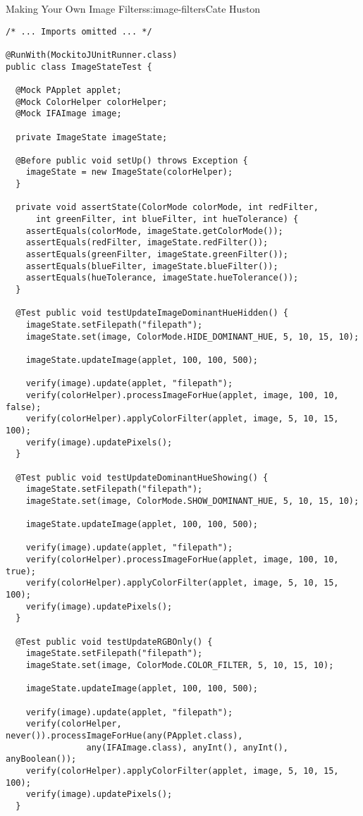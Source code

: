 \begin{aosachapter}{Making Your Own Image Filters}{s:image-filters}{Cate Huston}
\begin{verbatim}
/* ... Imports omitted ... */

@RunWith(MockitoJUnitRunner.class)
public class ImageStateTest {

  @Mock PApplet applet;
  @Mock ColorHelper colorHelper;
  @Mock IFAImage image;

  private ImageState imageState;

  @Before public void setUp() throws Exception {
    imageState = new ImageState(colorHelper);
  }

  private void assertState(ColorMode colorMode, int redFilter,
      int greenFilter, int blueFilter, int hueTolerance) {
    assertEquals(colorMode, imageState.getColorMode());
    assertEquals(redFilter, imageState.redFilter());
    assertEquals(greenFilter, imageState.greenFilter());
    assertEquals(blueFilter, imageState.blueFilter());
    assertEquals(hueTolerance, imageState.hueTolerance());
  }

  @Test public void testUpdateImageDominantHueHidden() {
    imageState.setFilepath("filepath");
    imageState.set(image, ColorMode.HIDE_DOMINANT_HUE, 5, 10, 15, 10);

    imageState.updateImage(applet, 100, 100, 500);

    verify(image).update(applet, "filepath");
    verify(colorHelper).processImageForHue(applet, image, 100, 10, false);
    verify(colorHelper).applyColorFilter(applet, image, 5, 10, 15, 100);
    verify(image).updatePixels();
  }

  @Test public void testUpdateDominantHueShowing() {
    imageState.setFilepath("filepath");
    imageState.set(image, ColorMode.SHOW_DOMINANT_HUE, 5, 10, 15, 10);

    imageState.updateImage(applet, 100, 100, 500);

    verify(image).update(applet, "filepath");
    verify(colorHelper).processImageForHue(applet, image, 100, 10, true);
    verify(colorHelper).applyColorFilter(applet, image, 5, 10, 15, 100);
    verify(image).updatePixels();
  }

  @Test public void testUpdateRGBOnly() {
    imageState.setFilepath("filepath");
    imageState.set(image, ColorMode.COLOR_FILTER, 5, 10, 15, 10);

    imageState.updateImage(applet, 100, 100, 500);

    verify(image).update(applet, "filepath");
    verify(colorHelper, never()).processImageForHue(any(PApplet.class), 
                any(IFAImage.class), anyInt(), anyInt(), anyBoolean());
    verify(colorHelper).applyColorFilter(applet, image, 5, 10, 15, 100);
    verify(image).updatePixels();
  }


\end{verbatim}
\end{aosachapter}
